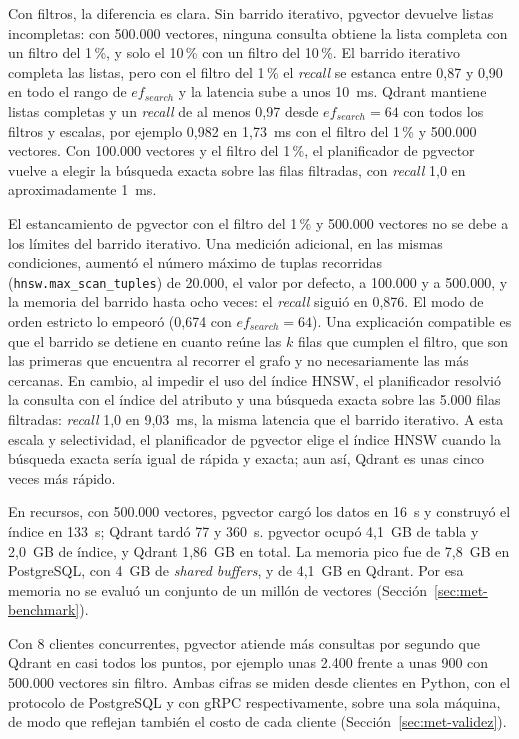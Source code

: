 Con filtros, la diferencia es clara. Sin barrido iterativo, pgvector devuelve listas incompletas: con 500.000 vectores, ninguna consulta obtiene la lista completa con un filtro del 1\,\%, y solo el 10\,\% con un filtro del 10\,\%. El barrido iterativo completa las listas, pero con el filtro del 1\,\% el \textit{recall} se estanca entre 0,87 y 0,90 en todo el rango de $ef_{search}$ y la latencia sube a unos 10~ms. Qdrant mantiene listas completas y un \textit{recall} de al menos 0,97 desde $ef_{search} = 64$ con todos los filtros y escalas, por ejemplo 0,982 en 1,73~ms con el filtro del 1\,\% y 500.000 vectores. Con 100.000 vectores y el filtro del 1\,\%, el planificador de pgvector vuelve a elegir la búsqueda exacta sobre las filas filtradas, con \textit{recall} 1,0 en aproximadamente 1~ms.

El estancamiento de pgvector con el filtro del 1\,\% y 500.000 vectores no se debe a los límites del barrido iterativo. Una medición adicional, en las mismas condiciones, aumentó el número máximo de tuplas recorridas (\texttt{hnsw.max\_scan\_tuples}) de 20.000, el valor por defecto, a 100.000 y a 500.000, y la memoria del barrido hasta ocho veces: el \textit{recall} siguió en 0,876. El modo de orden estricto lo empeoró (0,674 con $ef_{search} = 64$). Una explicación compatible es que el barrido se detiene en cuanto reúne las $k$ filas que cumplen el filtro, que son las primeras que encuentra al recorrer el grafo y no necesariamente las más cercanas. En cambio, al impedir el uso del índice HNSW, el planificador resolvió la consulta con el índice del atributo y una búsqueda exacta sobre las 5.000 filas filtradas: \textit{recall} 1,0 en 9,03~ms, la misma latencia que el barrido iterativo. A esta escala y selectividad, el planificador de pgvector elige el índice HNSW cuando la búsqueda exacta sería igual de rápida y exacta; aun así, Qdrant es unas cinco veces más rápido.

En recursos, con 500.000 vectores, pgvector cargó los datos en 16~s y construyó el índice en 133~s; Qdrant tardó 77 y 360~s. pgvector ocupó 4,1~GB de tabla y 2,0~GB de índice, y Qdrant 1,86~GB en total. La memoria pico fue de 7,8~GB en PostgreSQL, con 4~GB de \textit{shared buffers}, y de 4,1~GB en Qdrant. Por esa memoria no se evaluó un conjunto de un millón de vectores (Sección~\ref{sec:met-benchmark}).

Con 8 clientes concurrentes, pgvector atiende más consultas por segundo que Qdrant en casi todos los puntos, por ejemplo unas 2.400 frente a unas 900 con 500.000 vectores sin filtro. Ambas cifras se miden desde clientes en Python, con el protocolo de PostgreSQL y con gRPC respectivamente, sobre una sola máquina, de modo que reflejan también el costo de cada cliente (Sección~\ref{sec:met-validez}).

